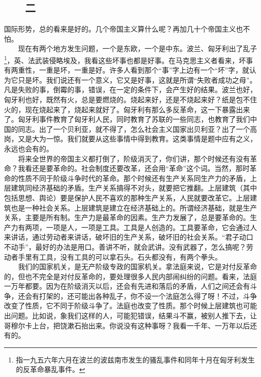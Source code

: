 \documentclass[cn,11pt,chinese]{elegantbook}
\def\myformat#1{\hfil\hfil #1}
\begin{document}
\subsection*{\myformat{　　二}}
国际形势，总的看来是好的。几个帝国主义算什么呢？再加几十个帝国主义也不怕。\\
　　现在有两个地方发生问题，一个是东欧，一个是中东。波兰、匈牙利出了乱子\footnote[2]{ 指一九五六年六月在波兰的波兹南市发生的骚乱事件和同年十月在匈牙利发生的反革命暴乱事件。}，英、法武装侵略埃及，我看这些坏事也都是好事。在马克思主义者看来，坏事有两重性，一重是坏，一重是好。许多人看到那个“事”字上边有一个“坏”字，就认为它只是坏。我们说还有一个意义，它又是好事，这就是所谓“失败者成功之母”。凡是失败的事，倒霉的事，错误，在一定的条件下，会产生好的结果。波兰也好，匈牙利也好，既然有火，总是要燃烧的。烧起来好，还是不烧起来好？纸是包不住火的，现在烧起来了，烧起来就好了。匈牙利有那么多反革命，这一下暴露出来了。匈牙利事件教育了匈牙利人民，同时教育了苏联的一些同志，也教育了我们中国的同志。出了一个贝利亚，就不得了，怎么社会主义国家出贝利亚？出了一个高岗，又是大为一惊。我们就要从这些事情中得到教育。这类事情是题中应有之义，永远也会有的。\\
　　将来全世界的帝国主义都打倒了，阶级消灭了，你们讲，那个时候还有没有革命？我看还是要革命的。社会制度还要改革，还会用“革命”这个词。当然，那时革命的性质不同于阶级斗争时代的革命。那个时候还有生产关系同生产力的矛盾，上层建筑同经济基础的矛盾。生产关系搞得不对头，就要把它推翻。上层建筑（其中包括思想、舆论）要是保护人民不喜欢的那种生产关系，人民就要改革它。上层建筑也是一种社会关系。上层建筑是建立在经济基础上的。所谓经济基础，就是生产关系，主要是所有制。生产力是最革命的因素。生产力发展了，总是要革命的。生产力有两项，一项是人，一项是工具。工具是人创造的。工具要革命，它会通过人来讲话，通过劳动者来讲话，破坏旧的生产关系，破坏旧的社会关系。“君子动口不动手”，最好的办法是用口。善讲不听，就会武讲。没有武器了，怎么搞呢？劳动者手里有工具，没有工具的可以拿石头。石头都没有，有两个拳头。\\
　　我们的国家机关，是无产阶级专政的国家机关。拿法庭来说，它是对付反革命的，但也不完全是对付反革命的，要处理很多人民内部闹纠纷的问题。看来，法庭一万年都要。因为在阶级消灭以后，还会有先进和落后的矛盾，人们之间还会有斗争，还会有打架的，还可能出各种乱子，你不设一个法庭怎么得了呀！不过，斗争改变了性质，它不同于阶级斗争了。法庭也改变了性质。那个时候上层建筑也可能出问题。比如说，象我们这样的人，可能犯错误，结果斗不赢，被别人推下去，让哥穆尔卡上台，把饶漱石抬出来。你说没有这种事呀？我看一千年、一万年以后还有的。\\
\end{document}
